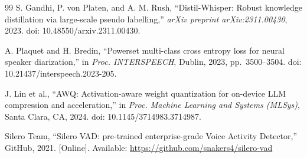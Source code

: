 \documentclass[conference]{IEEEtran}
\begin{document}
\begin{thebibliography}{99}
 S. Gandhi, P. von Platen, and A. M. Rush, ``Distil-Whisper: Robust knowledge distillation via large-scale pseudo labelling,'' \textit{arXiv preprint arXiv:2311.00430}, 2023. doi: 10.48550/arxiv.2311.00430.

 A. Plaquet and H. Bredin, ``Powerset multi-class cross entropy loss for neural speaker diarization,'' in \textit{Proc. INTERSPEECH}, Dublin, 2023, pp.~3500--3504. doi: 10.21437/interspeech.2023-205.

 J. Lin et al., ``AWQ: Activation-aware weight quantization for on-device LLM compression and acceleration,'' in \textit{Proc. Machine Learning and Systems (MLSys)}, Santa Clara, CA, 2024. doi: 10.1145/3714983.3714987.

 Silero Team, ``Silero VAD: pre-trained enterprise-grade Voice Activity Detector,'' GitHub, 2021. [Online]. Available: \url{https://github.com/snakers4/silero-vad}

\end{thebibliography}
\end{document}
